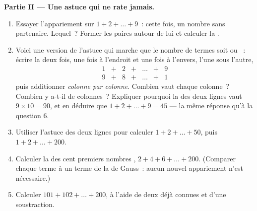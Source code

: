 \begin{problem}
\medskip
\noindent\textbf{Partie II --- Une astuce qui ne rate jamais.}
\begin{enumerate}[resume]
  \item Essayer l'appariement sur $1 + 2 + \dots + 9$~: cette fois,
        un nombre  sans partenaire. Lequel~? Former les paires
        autour de lui et calculer la .
  \item Voici une version de l'astuce qui marche que le nombre de
        termes soit  ou ~: écrire la  deux fois, une
        fois à l'endroit et une fois à l'envers, l'une sous l'autre,
        \[
        \begin{array}{ccccccc}
        1 & + & 2 & + & \dots & + & 9 \\
        9 & + & 8 & + & \dots & + & 1
        \end{array}
        \]
        puis additionner \emph{colonne par colonne}. Combien vaut
        chaque colonne~? Combien y a-t-il de colonnes~? Expliquer
        pourquoi la  des deux lignes vaut $9 \times 10 = 90$, et
        en déduire que $1 + 2 + \dots + 9 = 45$ --- la même réponse
        qu'à la question 6.
  \item Utiliser l'astuce des deux lignes pour calculer
        $1 + 2 + \dots + 50$, puis $1 + 2 + \dots + 200$.
  \item Calculer la  des cent premiers nombres \emph{},
        $2 + 4 + 6 + \dots + 200$. (Comparer chaque terme à un terme
        de la  de Gauss~: aucun nouvel appariement n'est
        nécessaire.)
  \item Calculer $101 + 102 + \dots + 200$, à l'aide de deux 
        déjà connues et d'une soustraction.
\end{enumerate}


\end{problem}
